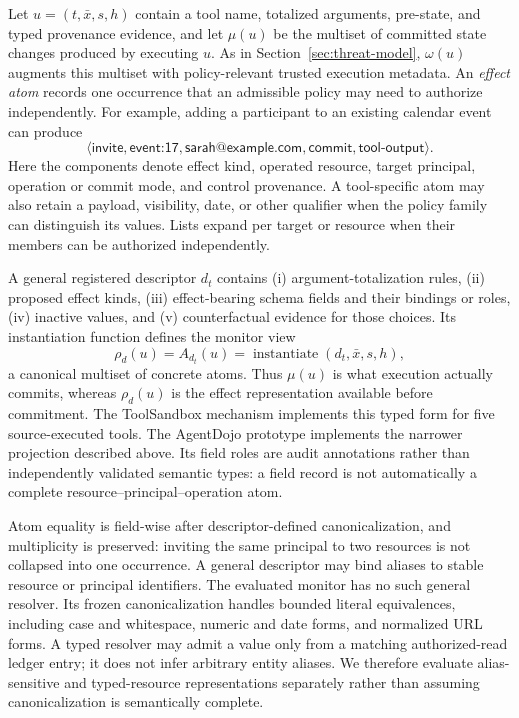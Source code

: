 \documentclass[letterpaper,twocolumn,10pt]{article}
\theoremstyle{definition}
\begin{document}
Let $u=(t,\bar{x},s,h)$ contain a tool name, totalized arguments, pre-state, and
typed provenance evidence, and let $\mu(u)$ be the multiset of committed state changes produced by
executing $u$.  As in Section~\ref{sec:threat-model}, $\omega(u)$ augments this
multiset with policy-relevant trusted execution metadata.  An \emph{effect atom} records one occurrence that an admissible
policy may need to authorize independently.  For example, adding a participant
to an existing calendar event can produce
\[
 \langle\textsf{invite},\textsf{event:17},\textsf{sarah@example.com},
          \textsf{commit},\textsf{tool-output}\rangle.
\]
Here the components denote effect kind, operated resource, target principal,
operation or commit mode, and control provenance.  A tool-specific atom may
also retain a payload, visibility, date, or other qualifier when the policy
family can distinguish its values.  Lists expand per target or resource when
their members can be authorized independently.

A general registered descriptor $d_t$ contains (i) argument-totalization rules,
(ii) proposed effect kinds, (iii) effect-bearing schema fields and their
bindings or roles, (iv) inactive values, and (v) counterfactual evidence for
those choices.  Its instantiation function defines the monitor view
\[
  \rho_d(u)=A_{d_t}(u)
    =\operatorname{instantiate}(d_t,\bar{x},s,h),
\]
a canonical multiset of concrete atoms.  Thus $\mu(u)$ is what execution
actually commits, whereas $\rho_d(u)$ is the effect representation available
before commitment.  The ToolSandbox mechanism implements this typed form for
five source-executed tools.  The AgentDojo prototype implements the narrower
projection described above.  Its field roles are audit annotations rather than
independently validated semantic types: a field record is not automatically a
complete resource--principal--operation atom.

Atom equality is field-wise after descriptor-defined canonicalization, and
multiplicity is preserved: inviting the same principal to two resources is not
collapsed into one occurrence.  A general descriptor may bind aliases to stable
resource or principal identifiers.  The evaluated monitor has no such general
resolver.  Its frozen canonicalization handles bounded literal equivalences,
including case and whitespace, numeric and date forms, and normalized URL
forms.  A typed resolver may admit a value only from a matching authorized-read
ledger entry; it does not infer arbitrary entity aliases.  We therefore
evaluate alias-sensitive and typed-resource representations separately rather
than assuming canonicalization is semantically complete.
\end{document}
